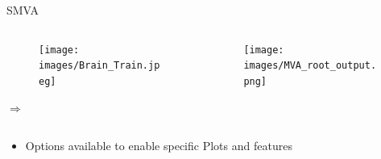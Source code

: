 \documentclass[9pt, xcolor=dvipsnames]{beamer}
\begin{document}
\begin{frame}{SMVA}
\begin{columns}
\begin{column}{0.20\textwidth}
\begin{figure}
\begin{flushleft}
\texttt{[image: images/Brain\_Train.jpeg]}
\end{flushleft}
\end{figure}

\begin{center}
$\Longrightarrow$
\end{center}
\end{column}

\begin{column}{0.40\textwidth}
\begin{figure}
\texttt{[image: images/MVA\_root\_output.png]}
\end{figure}
\end{column}
\end{columns}

\begin{itemize}
\item Options available to enable specific Plots and features
\end{itemize}
\end{frame}
\end{document}
